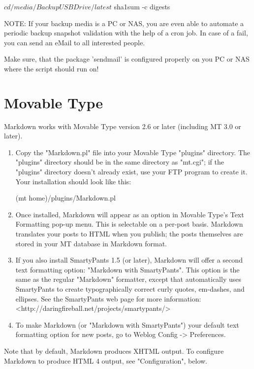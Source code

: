       $ cd /media/BackupUSBDrive/latest
      $ sha1sum -c digests

NOTE: If your backup media is a PC or NAS, you are even able to automate a periodic
      backup snapshot validation with the help of a cron job. In case of a fail,
      you can send an eMail to all interested people.

      Make sure, that the package 'sendmail' is configured properly on you PC or NAS
      where the script should run on!


\section{Movable Type}

Markdown works with Movable Type version 2.6 or later (including 
MT 3.0 or later).

\begin{enumerate}
\item  Copy the "Markdown.pl" file into your Movable Type "plugins"
    directory. The "plugins" directory should be in the same directory
    as "mt.cgi"; if the "plugins" directory doesn't already exist, use
    your FTP program to create it. Your installation should look like
    this:

        (mt home)/plugins/Markdown.pl

\item Once installed, Markdown will appear as an option in Movable Type's
    Text Formatting pop-up menu. This is selectable on a per-post basis.
    Markdown translates your posts to HTML when you publish; the posts
    themselves are stored in your MT database in Markdown format.

\item If you also install SmartyPants 1.5 (or later), Markdown will offer
    a second text formatting option: "Markdown with SmartyPants". This
    option is the same as the regular "Markdown" formatter, except that
    automatically uses SmartyPants to create typographically correct
    curly quotes, em-dashes, and ellipses. See the SmartyPants web page
    for more information: <http://daringfireball.net/projects/smartypants/>

\item To make Markdown (or "Markdown with SmartyPants") your default
    text formatting option for new posts, go to Weblog Config ->
    Preferences.
\end{enumerate}

Note that by default, Markdown produces XHTML output. To configure
Markdown to produce HTML 4 output, see "Configuration", below.


